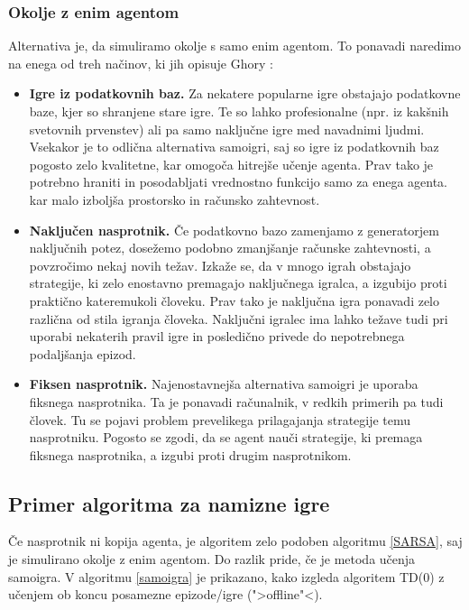 \documentclass[12pt,a4paper]{amsart}
\theoremstyle{definition} %
\theoremstyle{plain} %
\begin{document}
\subsubsection{Okolje z enim agentom}
Alternativa je, da simuliramo okolje s samo enim agentom. To ponavadi naredimo na enega od treh 
načinov, ki jih opisuje Ghory \cite{RLboard}:
\begin{itemize}
    \item \textbf{Igre iz podatkovnih baz.} Za nekatere popularne igre obstajajo podatkovne baze, 
            kjer so shranjene stare igre. Te so lahko profesionalne (npr. iz kakšnih svetovnih
            prvenstev) ali pa samo naključne igre med navadnimi ljudmi. Vsekakor je to odlična 
            alternativa samoigri, saj so igre iz podatkovnih baz pogosto zelo kvalitetne, kar omogoča 
            hitrejše učenje agenta. Prav tako je potrebno hraniti in posodabljati vrednostno funkcijo 
            samo za enega agenta. kar malo izboljša prostorsko in računsko zahtevnost.
    \item \textbf{Naključen nasprotnik.} Če podatkovno bazo zamenjamo z generatorjem naključnih potez, 
            dosežemo podobno zmanjšanje računske zahtevnosti, a povzročimo nekaj novih težav. Izkaže 
            se, da v mnogo igrah obstajajo strategije, ki zelo enostavno premagajo naključnega igralca, 
            a izgubijo proti praktično kateremukoli človeku. Prav tako je naključna igra ponavadi zelo 
            različna od stila igranja človeka. Naključni igralec ima lahko težave tudi pri uporabi 
            nekaterih pravil igre in posledično privede do nepotrebnega podaljšanja epizod.
    \item \textbf{Fiksen nasprotnik.} Najenostavnejša alternativa samoigri je uporaba fiksnega 
            nasprotnika. Ta je ponavadi računalnik, v redkih primerih pa tudi človek. Tu se pojavi 
            problem prevelikega prilagajanja strategije temu nasprotniku. Pogosto se zgodi, da se 
            agent nauči strategije, ki premaga fiksnega nasprotnika, a izgubi proti drugim 
            nasprotnikom.
\end{itemize}

\subsection{Primer algoritma za namizne igre}
Če nasprotnik ni kopija agenta, je algoritem zelo podoben algoritmu \ref{SARSA}, saj je simulirano 
okolje z enim agentom. Do razlik pride, če je metoda učenja samoigra. V algoritmu \ref{samoigra} je 
prikazano, kako izgleda algoritem TD($0$) z učenjem ob koncu posamezne epizode/igre (">offline"<).
\end{document}
